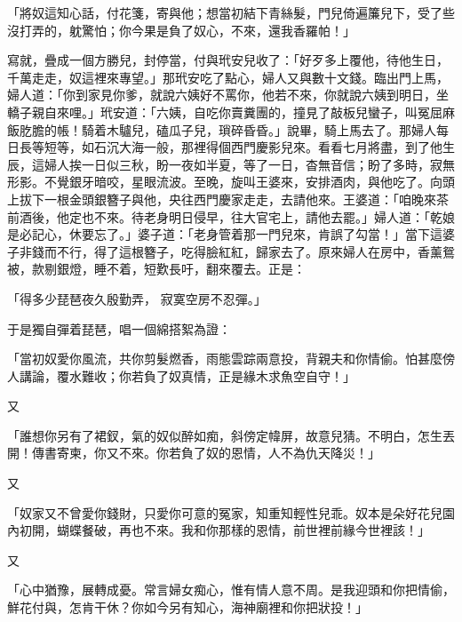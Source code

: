 「將奴這知心話，付花箋，寄與他；想當初結下青絲髮，門兒倚遍簾兒下，受了些沒打弄的，躭驚怕；你今果是負了奴心，不來，還我香羅帕！」

寫就，疊成一個方勝兒，封停當，付與玳安兒收了：「好歹多上覆他，待他生日，千萬走走，奴這裡來專望。」那玳安吃了點心，婦人又與數十文錢。臨出門上馬，婦人道：「你到家見你爹，就說六姨好不罵你，他若不來，你就說六姨到明日，坐轎子親自來哩。」玳安道：「六姨，自吃你賣糞團的，撞見了敲板兒蠻子，叫冤屈麻飯肐膽的帳！騎着木驢兒，磕瓜子兒，瑣碎昏昏。」說畢，騎上馬去了。那婦人每日長等短等，如石沉大海一般，那裡得個西門慶影兒來。看看七月將盡，到了他生辰，這婦人挨一日似三秋，盼一夜如半夏，等了一日，杳無音信；盼了多時，寂無形影。不覺銀牙暗咬，星眼流波。至晚，旋叫王婆來，安排酒肉，與他吃了。向頭上拔下一根金頭銀簪子與他，央往西門慶家走走，去請他來。王婆道：「咱晚來茶前酒後，他定也不來。待老身明日侵早，往大官宅上，請他去罷。」婦人道：「乾娘是必記心，休要忘了。」婆子道：「老身管着那一門兒來，肯誤了勾當！」當下這婆子非錢而不行，得了這根簪子，吃得臉紅紅，歸家去了。原來婦人在房中，香薰鴛被，款剔銀燈，睡不着，短歎長吁，翻來覆去。正是：

「得多少琵琶夜久殷勤弄，  寂寞空房不忍彈。」

于是獨自彈着琵琶，唱一個綿搭絮為證：

「當初奴愛你風流，共你剪髮燃香，雨態雲踪兩意投，背親夫和你情偷。怕甚麼傍人講論，覆水難收；你若負了奴真情，正是緣木求魚空自守！」

又

「誰想你另有了裙釵，氣的奴似醉如痴，斜傍定幃屏，故意兒猜。不明白，怎生丟開！傳書寄柬，你又不來。你若負了奴的恩情，人不為仇天降災！」

又

「奴家又不曾愛你錢財，只愛你可意的冤家，知重知輕性兒乖。奴本是朵好花兒園內初開，蝴蝶餐破，再也不來。我和你那樣的恩情，前世裡前緣今世裡該！」

又

「心中猶豫，展轉成憂。常言婦女痴心，惟有情人意不周。是我迎頭和你把情偷，鮮花付與，怎肯干休？你如今另有知心，海神廟裡和你把狀投！」

